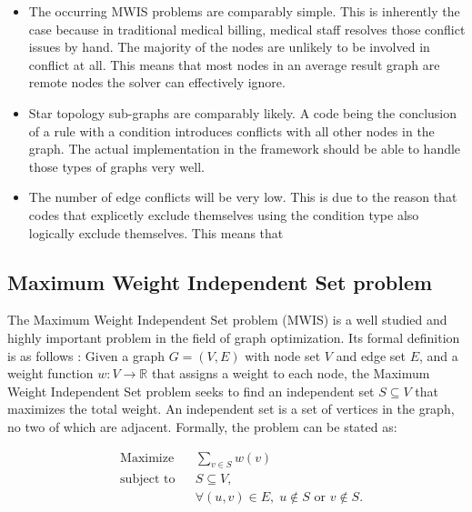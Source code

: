 \begin{itemize}
    \item The occurring MWIS problems are comparably simple.
    This is inherently the case because in traditional medical billing, medical staff resolves those conflict issues by hand.
    The majority of the nodes are unlikely to be involved in conflict at all.
    This means that most nodes in an average result graph are remote nodes the solver can effectively ignore.
    \item Star topology sub-graphs are comparably likely.
    A code being the conclusion of a rule with a condition  introduces conflicts with all other nodes in the graph.
    The actual implementation in the framework should be able to handle those types of graphs very well.
    \item The number of edge conflicts will be very low.
    This is due to the reason that codes that explicetly exclude themselves using the  condition type also logically exclude themselves.
    This means that
\end{itemize}

\subsection{Maximum Weight Independent Set problem}\label{subsec:maximum-weight-independent-set-problem}

The Maximum Weight Independent Set problem (MWIS) is a well studied and highly important problem in the field of graph optimization.
Its formal definition is as follows \cite{SAKAI2003313}:
Given a graph $G = (V, E)$ with node set $V$ and edge set $E$, and a weight function $w: V \rightarrow \mathbb{R}$ that assigns a weight to each node, the Maximum Weight Independent Set problem seeks to find an independent set $S \subseteq V$ that maximizes the total weight.
An independent set is a set of vertices in the graph, no two of which are adjacent.
Formally, the problem can be stated as:

\begin{equation}
    \begin{aligned}
        & \text{Maximize}
        & & \sum_{v \in S} w(v) \\
        & \text{subject to}
        & & S \subseteq V, \\
        &&& \forall (u, v) \in E, \; u \notin S \text{ or } v \notin S.
    \end{aligned}\label{eq:mwis}
\end{equation}

